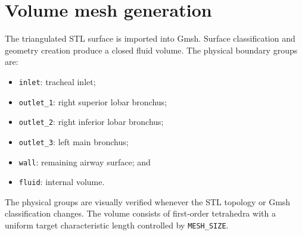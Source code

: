 \documentclass[11pt,a4paper]{article}
\begin{document}
\section{Volume mesh generation}
\label{sec:mesh}

The triangulated STL surface is imported into Gmsh. Surface classification and
geometry creation produce a closed fluid volume. The physical boundary groups
are:

\begin{itemize}
  \item \texttt{inlet}: tracheal inlet;
  \item \texttt{outlet\_1}: right superior lobar bronchus;
  \item \texttt{outlet\_2}: right inferior lobar bronchus;
  \item \texttt{outlet\_3}: left main bronchus;
  \item \texttt{wall}: remaining airway surface; and
  \item \texttt{fluid}: internal volume.
\end{itemize}

The physical groups are visually verified whenever the STL topology or Gmsh
classification changes. The volume consists of first-order tetrahedra with a
uniform target characteristic length controlled by \texttt{MESH\_SIZE}.

\begin{table}[htbp]
  \centering
  \caption{Replicable mesh settings and quality metrics. All current volume
  elements are first-order tetrahedra. Add the exact Gmsh version and final
  values from each \texttt{checkMesh} log.}
  \label{tab:meshes}
\end{table}
\end{document}
